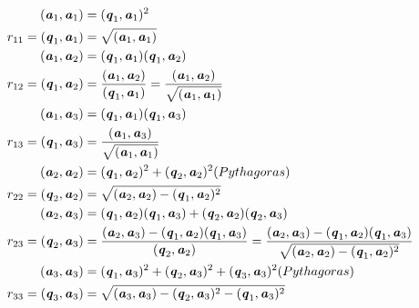\begin{align*}
	(\textbf{\textit{a}}_{1},\textbf{\textit{a}}_{1})&=(\textbf{\textit{q}}_{1},\textbf{\textit{a}}_{1})^{2} \\
	r_{11}=(\textbf{\textit{q}}_{1},\textbf{\textit{a}}_{1})&=\sqrt{(\textbf{\textit{a}}_{1},\textbf{\textit{a}}_{1})}\\
	(\textbf{\textit{a}}_{1},\textbf{\textit{a}}_{2})&=(\textbf{\textit{q}}_{1},\textbf{\textit{a}}_{1})(\textbf{\textit{q}}_{1},\textbf{\textit{a}}_{2})\\
	r_{12}=(\textbf{\textit{q}}_{1},\textbf{\textit{a}}_{2})&=\frac{(\textbf{\textit{a}}_{1},\textbf{\textit{a}}_{2})}{(\textbf{\textit{q}}_{1},\textbf{\textit{a}}_{1})}=\frac{ (\textbf{\textit{a}}_{1},\textbf{\textit{a}}_{2})}{\sqrt{(\textbf{\textit{a}}_{1},\textbf{\textit{a}}_{1})}}\\
	(\textbf{\textit{a}}_{1},\textbf{\textit{a}}_{3})&=(\textbf{\textit{q}}_{1},\textbf{\textit{a}}_{1})(\textbf{\textit{q}}_{1},\textbf{\textit{a}}_{3})\\
	r_{13}=(\textbf{\textit{q}}_{1},\textbf{\textit{a}}_{3})&=\frac{ (\textbf{\textit{a}}_{1},\textbf{\textit{a}}_{3})}{\sqrt{(\textbf{\textit{a}}_{1},\textbf{\textit{a}}_{1})}}\\
	(\textbf{\textit{a}}_{2},\textbf{\textit{a}}_{2})&=(\textbf{\textit{q}}_{1},\textbf{\textit{a}}_{2})^{2}+(\textbf{\textit{q}}_{2},\textbf{\textit{a}}_{2})^{2}(Pythagoras)\\
	r_{22}=(\textbf{\textit{q}}_{2},\textbf{\textit{a}}_{2})&=\sqrt{(\textbf{\textit{a}}_{2},\textbf{\textit{a}}_{2})-(\textbf{\textit{q}}_{1},\textbf{\textit{a}}_{2})^{2}}\\
	(\textbf{\textit{a}}_{2},\textbf{\textit{a}}_{3})&=(\textbf{\textit{q}}_{1},\textbf{\textit{a}}_{2})(\textbf{\textit{q}}_{1},\textbf{\textit{a}}_{3})+(\textbf{\textit{q}}_{2},\textbf{\textit{a}}_{2})(\textbf{\textit{q}}_{2},\textbf{\textit{a}}_{3})\\
	r_{23}=(\textbf{\textit{q}}_{2},\textbf{\textit{a}}_{3})&=\frac{(\textbf{\textit{a}}_{2},\textbf{\textit{a}}_{3})-(\textbf{\textit{q}}_{1},\textbf{\textit{a}}_{2})(\textbf{\textit{q}}_{1},\textbf{\textit{a}}_{3})}{(\textbf{\textit{q}}_{2},\textbf{\textit{a}}_{2})}=\frac{(\textbf{\textit{a}}_{2},\textbf{\textit{a}}_{3})-(\textbf{\textit{q}}_{1},\textbf{\textit{a}}_{2})(\textbf{\textit{q}}_{1},\textbf{\textit{a}}_{3})}{\sqrt{(\textbf{\textit{a}}_{2},\textbf{\textit{a}}_{2})-(\textbf{\textit{q}}_{1},\textbf{\textit{a}}_{2})^{2}}}\\
	(\textbf{\textit{a}}_{3},\textbf{\textit{a}}_{3})&=(\textbf{\textit{q}}_{1},\textbf{\textit{a}}_{3})^{2}+(\textbf{\textit{q}}_{2},\textbf{\textit{a}}_{3})^{2}+(\textbf{\textit{q}}_{3},\textbf{\textit{a}}_{3})^{2}(Pythagoras)\\
	r_{33}=(\textbf{\textit{q}}_{3},\textbf{\textit{a}}_{3})&=\sqrt{(\textbf{\textit{a}}_{3},\textbf{\textit{a}}_{3})-(\textbf{\textit{q}}_{2},\textbf{\textit{a}}_{3})^{2}-(\textbf{\textit{q}}_{1},\textbf{\textit{a}}_{3})^{2}}
\end{align*}

